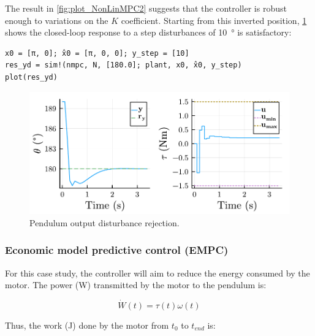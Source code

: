 The result in \cref{fig:plot_NonLinMPC2} suggests that the controller is robust enough to variations on the $K$ coefficient. Starting from this inverted position, \cref{fig:plot_NonLinMPC3} shows the closed-loop response to a step disturbances of \SI{10}{\degree} is satisfactory:
\begin{verbatim}
x0 = [π, 0]; x̂0 = [π, 0, 0]; y_step = [10]
res_yd = sim!(nmpc, N, [180.0]; plant, x0, x̂0, y_step)
plot(res_yd)
\end{verbatim}

\begin{figure}[h]
    \centering
    \includegraphics[width=\columnwidth]{fig/plot_NonLinMPC3.pdf}
    \caption{Pendulum output disturbance rejection.}
    \label{fig:plot_NonLinMPC3}
\end{figure}


\textbf{}

\subsubsection{Economic model predictive control (EMPC)}

For this case study, the controller will aim to reduce the energy consumed by the motor. The power (\si{\watt}) transmitted by the motor to the pendulum is:

\begin{equation}
\dot{W}(t) = \tau(t) \omega(t) 
\end{equation}

Thus, the work (\si{\joule}) done by the motor from $t_0$ to $t_{end}$ is:

